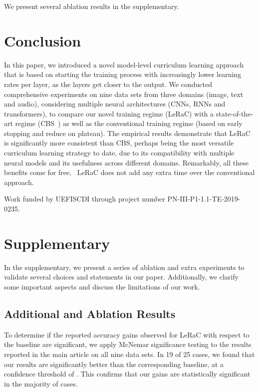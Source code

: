 \documentclass[10pt,twocolumn,letterpaper]{article}
\begin{document}
 We present several ablation results in the supplementary.

\vspace{-0.15cm}
\section{Conclusion}
\vspace{-0.1cm}

In this paper, we introduced a novel model-level curriculum learning approach that is based on starting the training process with increasingly lower learning rates per layer, as the layers get closer to the output. We conducted comprehensive experiments on nine data sets from three domains (image, text and audio), considering multiple neural architectures (CNNs, RNNs and transformers), to compare our novel training regime (LeRaC) with a state-of-the-art regime (CBS~\cite{Sinha-NIPS-2020}) as well as the conventional training regime (based on early stopping and reduce on plateau). The empirical results demonstrate that LeRaC is significantly more consistent than CBS, perhaps being the most versatile curriculum learning strategy to date, due to its compatibility with multiple neural models and its usefulness across different domains. Remarkably, all these benefits come for free, \ie~LeRaC does not add any extra time over the conventional approach.

Work funded by UEFISCDI through project number PN-III-P1-1.1-TE-2019-0235.




\clearpage

\section{Supplementary}
\vspace{-0.1cm}
In the supplementary, we present a series of ablation and extra experiments to validate several choices and statements in our paper. Additionally, we clarify some important aspects and discuss the limitations of our work.

\subsection{Additional and Ablation Results}
\vspace{-0.1cm}

To determine if the reported accuracy gains observed for LeRaC with respect to the baseline are significant, we apply McNemar significance testing \cite{Dietterich-NC-1998} to the results reported in the main article on all nine data sets. In 19 of 25 cases, we found that our results are significantly better than the corresponding baseline, at a confidence threshold of . This confirms that our gains are statistically significant in the majority of cases.
\end{document}
